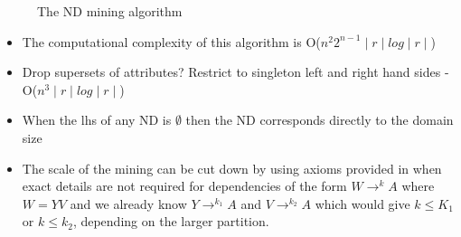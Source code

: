 {\renewcommand{\baselinestretch}{1}
\begin{figure}[ht]
\begin{center}
\end{center}
\caption{\label{numdep:fig:nd_mine} The ND mining algorithm}
\end{figure}
}

\begin{itemize}
\item The computational complexity of this algorithm is O($n^2 2^{n-1}
\mid r \mid log \mid r \mid$)
\item Drop supersets of attributes? Restrict to singleton left and right
hand sides - O($n^3\mid r \mid log \mid r \mid$)
\item When the lhs of any ND is $\emptyset$ then the ND corresponds
directly to the domain size
\item The scale of the mining can be cut down by using axioms provided
in \cite{gm85b,gm85a} when exact details are not required for
dependencies of the form $W \to^k A$ where $W = YV$ and we already
know $Y \to^{k_1} A$ and $V \to^{k_2} A$ which would give $k \le K_1$
or $k \le k_2$, depending on the larger partition.
\end{itemize}


